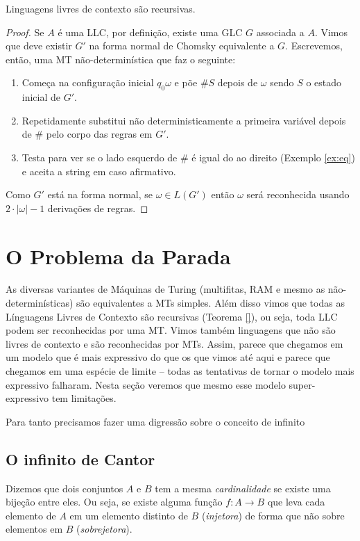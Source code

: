 \begin{theorem}
  Linguagens livres de contexto são recursivas.
\end{theorem}
\begin{proof}
  Se $A$ é uma LLC, por definição, existe uma GLC $G$ associada a $A$.
  Vimos que deve existir $G'$ na forma normal de Chomsky equivalente a $G$.
  Escrevemos, então, uma MT não-determinística que faz o seguinte:
  \begin{enumerate}
    \item Começa na configuração inicial $q_0\omega$ e põe $\#S$ depois de $\omega$ sendo $S$ o estado inicial de $G'$.
    \item Repetidamente substitui não deterministicamente a primeira variável depois de $\#$ pelo corpo das regras em $G'$.
    \item Testa para ver se o lado esquerdo de $\#$ é igual do ao direito (Exemplo \ref{ex:eq}) e aceita a string em caso afirmativo.
    \end{enumerate}
  Como $G'$ está na forma normal, se $\omega \in L(G')$ então $\omega$ será reconhecida usando $2\cdot|\omega| - 1$ derivações de regras.
\end{proof}

\section{O Problema da Parada}
\label{sec:problema-parada}

As diversas variantes de Máquinas de Turing (multifitas, RAM e mesmo as não-determinísticas) são equivalentes a MTs simples.
Além disso vimos que todas as Línguagens Livres de Contexto são recursivas (Teorema \ref{}), ou seja, toda LLC podem ser reconhecidas por uma MT.
Vimos também linguagens que não são livres de contexto e são reconhecidas por MTs.
Assim, parece que chegamos em um modelo que é mais expressivo do que os que vimos até aqui e parece que chegamos em uma espécie de limite -- todas as tentativas de tornar o modelo mais expressivo falharam.
Nesta seção veremos que mesmo esse modelo super-expressivo tem limitações.

Para tanto precisamos fazer uma digressão sobre o conceito de infinito

\subsection*{O infinito de Cantor}

Dizemos que dois conjuntos $A$ e $B$ tem a mesma {\em cardinalidade} se existe uma bijeção entre eles.
Ou seja, se existe alguma função $f: A \to B$ que leva cada elemento de $A$ em um elemento distinto de $B$ ({\em injetora}) de forma que não sobre elementos em $B$ ({\em sobrejetora}).

